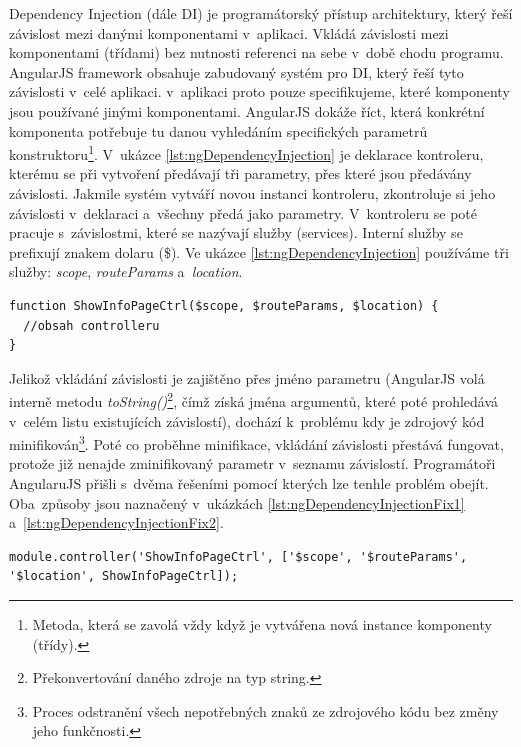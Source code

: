 
Dependency Injection (dále DI) je programátorský přístup architektury, který řeší závislost mezi danými komponentami v~aplikaci. Vkládá závislosti mezi komponentami (třídami) bez nutnosti referenci na sebe v~době chodu programu. AngularJS framework obsahuje zabudovaný systém pro DI, který řeší tyto závislosti v~celé aplikaci. v~aplikaci proto pouze specifikujeme, které komponenty jsou používané jinými komponentami. AngularJS dokáže říct, která konkrétní komponenta potřebuje tu danou vyhledáním specifických parametrů konstruktoru\footnote{Metoda, která se zavolá vždy když je vytvářena nová instance komponenty (třídy).}. V~ukázce \ref{lst:ngDependencyInjection} je deklarace kontroleru, kterému se při vytvoření předávají tři parametry, přes které jsou předávány závislosti. Jakmile systém vytváří novou instanci kontroleru, zkontroluje si jeho závislosti v~deklaraci a~všechny předá jako parametry. V~kontroleru se poté pracuje s~závislostmi, které se nazývají služby (services). Interní služby se prefixují znakem dolaru (\$). Ve ukázce \ref{lst:ngDependencyInjection} používáme tři služby: \textit{scope}, \textit{routeParams} a~\textit{location}. \\

\begin{lstlisting}[numbers=none, caption=Ukázka vkládání závislosti, label=lst:ngDependencyInjection]
function ShowInfoPageCtrl($scope, $routeParams, $location) {
  //obsah controlleru
}
\end{lstlisting}

Jelikož vkládání závislosti je zajištěno přes jméno parametru (AngularJS volá interně metodu \textit{toString()}\footnote{Překonvertování daného zdroje na typ string.}, čímž získá jména argumentů, které poté prohledává v~celém listu existujících závislostí), dochází k~problému kdy je zdrojový kód minifikován\footnote{Proces odstranění všech nepotřebných znaků ze zdrojového kódu bez změny jeho funkčnosti.}. Poté co proběhne minifikace, vkládání závislosti přestává fungovat, protože již nenajde zminifikovaný parametr v~seznamu závislostí. Programátoři AngularuJS přišli s~dvěma řešeními pomocí kterých lze tenhle problém obejít. Oba~způsoby jsou naznačený v~ukázkách \ref{lst:ngDependencyInjectionFix1} a~\ref{lst:ngDependencyInjectionFix2}. \\

\begin{lstlisting}[numbers=none, caption=Vložení závislostí v~poli, label=lst:ngDependencyInjectionFix1]
module.controller('ShowInfoPageCtrl', ['$scope', '$routeParams', '$location', ShowInfoPageCtrl]);
\end{lstlisting}


